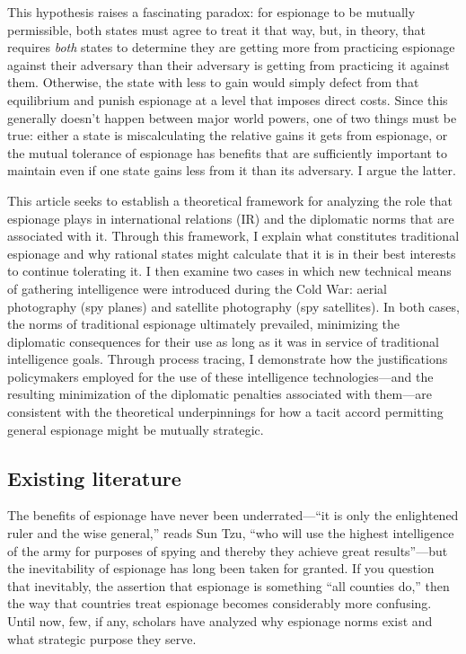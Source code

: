 \documentclass[14pt]{extarticle}
\begin{document}
This hypothesis raises a fascinating paradox: for espionage to be mutually permissible, both states must agree to treat it that way, but, in theory, that requires \emph{both} states to determine they are getting more from practicing espionage against their adversary than their adversary is getting from practicing it against them. Otherwise, the state with less to gain would simply defect from that equilibrium and punish espionage at a level that imposes direct costs. Since this generally doesn't happen between major world powers, one of two things must be true: either a state is miscalculating the relative gains it gets from espionage, or the mutual tolerance of espionage has benefits that are sufficiently important to maintain even if one state gains less from it than its adversary. I argue the latter.

This article seeks to establish a theoretical framework for analyzing the role that espionage plays in international relations (IR) and the diplomatic norms that are associated with it. Through this framework, I explain what constitutes traditional espionage and why rational states might calculate that it is in their best interests to continue tolerating it. I then examine two cases in which new technical means of gathering intelligence were introduced during the Cold War: aerial photography (spy planes) and satellite photography (spy satellites). In both cases, the norms of traditional espionage ultimately prevailed, minimizing the diplomatic consequences for their use as long as it was in service of traditional intelligence goals. Through process tracing, I demonstrate how the justifications policymakers employed for the use of these intelligence technologies---and the resulting minimization of the diplomatic penalties associated with them---are consistent with the theoretical underpinnings for how a tacit accord permitting general espionage might be mutually strategic.

\subsection{Existing literature}
The benefits of espionage have never been underrated---\enquote{it is only the enlightened ruler and the wise general,} reads Sun Tzu, \enquote{who will use the highest intelligence of the army for purposes of spying and thereby they achieve great results}---but the inevitability of espionage has long been taken for granted. If you question that inevitably, the assertion that espionage is something \enquote{all counties do,} then the way that countries treat espionage becomes considerably more confusing. Until now, few, if any, scholars have analyzed why espionage norms exist and what strategic purpose they serve.
\end{document}
